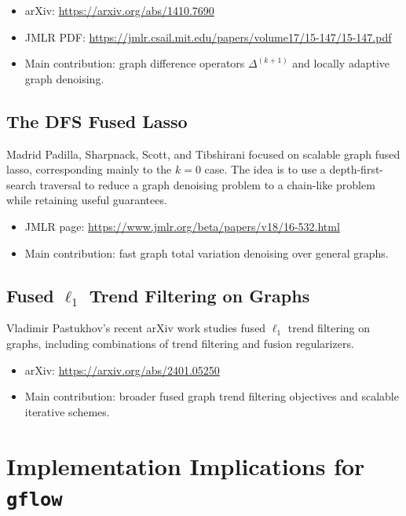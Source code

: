 \documentclass[11pt]{article}
\begin{document}
\begin{itemize}
  \item arXiv: \url{https://arxiv.org/abs/1410.7690}
  \item JMLR PDF: \url{https://jmlr.csail.mit.edu/papers/volume17/15-147/15-147.pdf}
  \item Main contribution: graph difference operators \(\Delta^{(k+1)}\) and
        locally adaptive graph denoising.
\end{itemize}

\subsection{The DFS Fused Lasso}

Madrid Padilla, Sharpnack, Scott, and Tibshirani focused on scalable graph
fused lasso, corresponding mainly to the \(k=0\) case.  The idea is to use a
depth-first-search traversal to reduce a graph denoising problem to a chain-like
problem while retaining useful guarantees.

\begin{itemize}
  \item JMLR page: \url{https://www.jmlr.org/beta/papers/v18/16-532.html}
  \item Main contribution: fast graph total variation denoising over general
        graphs.
\end{itemize}

\subsection{Fused \(\ell_1\) Trend Filtering on Graphs}

Vladimir Pastukhov's recent arXiv work studies fused \(\ell_1\) trend
filtering on graphs, including combinations of trend filtering and fusion
regularizers.

\begin{itemize}
  \item arXiv: \url{https://arxiv.org/abs/2401.05250}
  \item Main contribution: broader fused graph trend filtering objectives and
        scalable iterative schemes.
\end{itemize}

\section{Implementation Implications for \texttt{gflow}}
\end{document}
